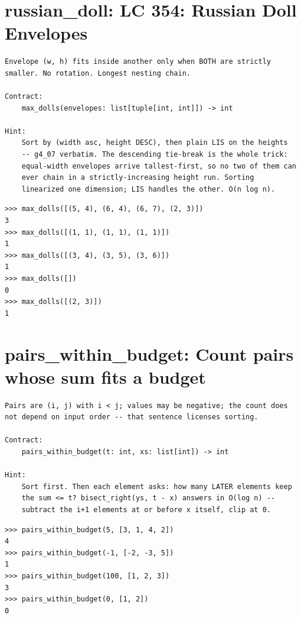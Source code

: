 \documentclass[10pt,letterpaper]{book}
\begin{document}
\section{russian\_doll: LC 354: Russian Doll Envelopes}
\begin{lstlisting}[style=ex]
Envelope (w, h) fits inside another only when BOTH are strictly
smaller. No rotation. Longest nesting chain.

Contract:
    max_dolls(envelopes: list[tuple[int, int]]) -> int

Hint:
    Sort by (width asc, height DESC), then plain LIS on the heights
    -- g4_07 verbatim. The descending tie-break is the whole trick:
    equal-width envelopes arrive tallest-first, so no two of them can
    ever chain in a strictly-increasing height run. Sorting
    linearized one dimension; LIS handles the other. O(n log n).
\end{lstlisting}
\begin{lstlisting}[style=ex]
>>> max_dolls([(5, 4), (6, 4), (6, 7), (2, 3)])
3
>>> max_dolls([(1, 1), (1, 1), (1, 1)])
1
>>> max_dolls([(3, 4), (3, 5), (3, 6)])
1
>>> max_dolls([])
0
>>> max_dolls([(2, 3)])
1
\end{lstlisting}

\section{pairs\_within\_budget: Count pairs whose sum fits a budget}
\begin{lstlisting}[style=ex]
Pairs are (i, j) with i < j; values may be negative; the count does
not depend on input order -- that sentence licenses sorting.

Contract:
    pairs_within_budget(t: int, xs: list[int]) -> int

Hint:
    Sort first. Then each element asks: how many LATER elements keep
    the sum <= t? bisect_right(ys, t - x) answers in O(log n) --
    subtract the i+1 elements at or before x itself, clip at 0.
\end{lstlisting}
\begin{lstlisting}[style=ex]
>>> pairs_within_budget(5, [3, 1, 4, 2])
4
>>> pairs_within_budget(-1, [-2, -3, 5])
1
>>> pairs_within_budget(100, [1, 2, 3])
3
>>> pairs_within_budget(0, [1, 2])
0
\end{lstlisting}
\end{document}
